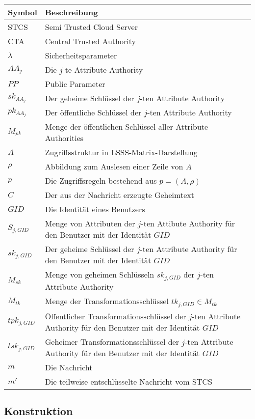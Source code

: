 \begin{center}
\begin{small}
	\begin{tabular}{p{3cm}p{9cm}}
		\hline
		Symbol & Beschreibung \\
		\hline
		STCS & Semi Trusted Cloud Server \\
		CTA & Central Trusted Authority \\
		$\lambda$ & Sicherheitsparameter \\
		$AA_j$ & Die $j$-te Attribute Authority \\
		$PP$ & Public Parameter \\
		$sk_{AA_j}$ & Der geheime Schlüssel der $j$-ten Attribute Authority \\
		$pk_{AA_j}$ & Der öffentliche Schlüssel der $j$-ten Attribute Authority \\
		$M_{pk}$ & Menge der öffentlichen Schlüssel aller Attribute Authorities \\
		$A$ & Zugriffsstruktur in LSSS-Matrix-Darstellung \\
		$\rho$ & Abbildung zum Auslesen einer Zeile von $A$ \\
		$p$ & Die Zugriffsregeln bestehend aus $p = \left(A, \rho\right)$ \\
		$C$ & Der aus der Nachricht erzeugte Geheimtext \\
		$GID$ & Die Identität eines Benutzers \\
		$S_{j, GID}$ & Menge von Attributen der $j$-ten Attibute Authority für den
		Benutzer mit der Identität $GID$ \\
		$sk_{j, GID}$ & Der geheime Schlüssel der $j$-ten Attribute Authority für
		den Benutzer mit der Identität $GID$ \\
		$M_{sk}$ & Menge von geheimen Schlüsseln $sk_{j, GID}$ der $j$-ten Attribute Authority \\
		$M_{tk}$ & Menge der Transformationsschlüssel $tk_{j, GID} \in M_{tk}$ \\
		$tpk_{j, GID}$ & Öffentlicher Transformationsschlüssel der $j$-ten
		Attribute Authority für den Benutzer mit der Identität $GID$ \\
		$tsk_{j, GID}$ & Geheimer Transformationsschlüssel der $j$-ten
		Attribute Authority für den Benutzer mit der Identität $GID$ \\
		$m$ & Die Nachricht \\
		$m'$ & Die teilweise entschlüsselte Nachricht vom STCS \\
		\hline
	\end{tabular}
\end{small}
\end{center}

\subsection{Konstruktion}

